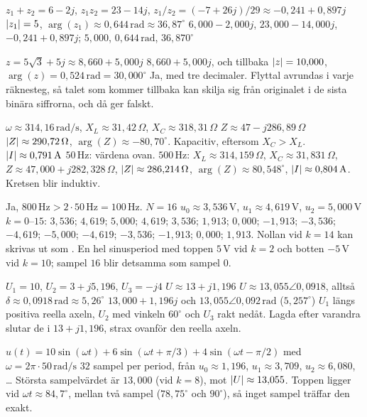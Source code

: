 \begin{facit}
  $z_1 + z_2 = 6 - 2j$, $z_1 z_2 = 23 - 14j$,
$z_1/z_2 = (-7 + 26j)/29 \approx -0{,}241 + 0{,}897j$
 $\lvert z_1\rvert = 5$, $\arg(z_1) \approx 0{,}644\,\text{rad} \approx 36{,}87^{\circ}$
 $6{,}000 - 2{,}000j$, $23{,}000 - 14{,}000j$, $-0{,}241 + 0{,}897j$; $5{,}000$,
$0{,}644\,\text{rad}$, $36{,}870^{\circ}$

  $z = 5\sqrt{3} + 5j \approx 8{,}660 + 5{,}000j$
 $8{,}660 + 5{,}000j$, och tillbaka $\lvert z\rvert = 10{,}000$,
$\arg(z) = 0{,}524\,\text{rad} = 30{,}000^{\circ}$
 Ja, med tre decimaler. Flyttal avrundas i varje räknesteg, så talet som kommer tillbaka
kan skilja sig från originalet i de sista binära siffrorna, och då ger \code{==} falskt.

  $\omega \approx 314{,}16\,\text{rad/s}$, $X_L \approx 31{,}42\,\Omega$,
$X_C \approx 318{,}31\,\Omega$
 $Z \approx 47 - j286{,}89\,\Omega$
 $\lvert Z\rvert \approx 290{,}72\,\Omega$, $\arg(Z) \approx -80{,}70^{\circ}$. Kapacitiv,
eftersom $X_C > X_L$.
 $\lvert I\rvert \approx 0{,}791\,\text{A}$
 $50\,\text{Hz}$: värdena ovan. $500\,\text{Hz}$: $X_L \approx 314{,}159\,\Omega$,
$X_C \approx 31{,}831\,\Omega$, $Z \approx 47{,}000 + j282{,}328\,\Omega$,
$\lvert Z\rvert \approx 286{,}214\,\Omega$, $\arg(Z) \approx 80{,}548^{\circ}$,
$\lvert I\rvert \approx 0{,}804\,\text{A}$. Kretsen blir induktiv.

  Ja, $800\,\text{Hz} > 2 \cdot 50\,\text{Hz} = 100\,\text{Hz}$.
 $N = 16$
 $u_0 \approx 3{,}536\,\text{V}$, $u_1 \approx 4{,}619\,\text{V}$, $u_2 = 5{,}000\,\text{V}$
 $k = 0$--$15$: $3{,}536$; $4{,}619$; $5{,}000$; $4{,}619$; $3{,}536$; $1{,}913$; $0{,}000$;
$-1{,}913$; $-3{,}536$; $-4{,}619$; $-5{,}000$; $-4{,}619$; $-3{,}536$; $-1{,}913$; $0{,}000$;
$1{,}913$. Nollan vid $k = 14$ kan skrivas ut som .
 En hel sinusperiod med toppen $5\,\text{V}$ vid $k = 2$ och botten $-5\,\text{V}$ vid
$k = 10$; sampel $16$ blir detsamma som sampel $0$.

  $U_1 = 10$, $U_2 = 3 + j5{,}196$, $U_3 = -j4$
 $U \approx 13 + j1{,}196$
 $U \approx 13{,}055\angle 0{,}0918$, alltså $\delta \approx 0{,}0918\,\text{rad}
\approx 5{,}26^{\circ}$
 $13{,}000 + 1{,}196j$ och $13{,}055\angle 0{,}092\,\text{rad}$ ($5{,}257^{\circ}$)
 $U_1$ längs positiva reella axeln, $U_2$ med vinkeln $60^{\circ}$ och $U_3$ rakt nedåt.
Lagda efter varandra slutar de i $13 + j1{,}196$, strax ovanför den reella axeln.

  $u(t) = 10\sin(\omega t) + 6\sin(\omega t + \pi/3) + 4\sin(\omega t - \pi/2)$ med
$\omega = 2\pi \cdot 50\,\text{rad/s}$
 $32$ sampel per period, från $u_0 \approx 1{,}196$, $u_1 \approx 3{,}709$,
$u_2 \approx 6{,}080$, \ldots
{} Största sampelvärdet är $13{,}000$ (vid $k = 8$), mot $\lvert U\rvert \approx 13{,}055$. Toppen
ligger vid $\omega t \approx 84{,}7^{\circ}$, mellan två sampel ($78{,}75^{\circ}$ och
$90^{\circ}$), så inget sampel träffar den exakt.


\end{facit}
